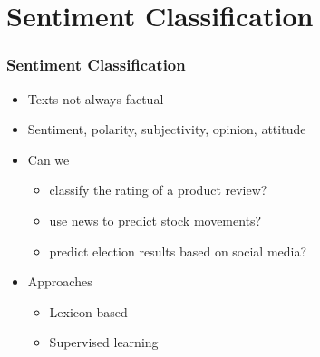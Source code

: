 
\section{Sentiment Classification}

\begin{frame}
\frametitle{Sentiment Classification}
\begin{itemize}
    \item Texts not always factual
    \item Sentiment, polarity, subjectivity, opinion, attitude
    \end{itemize}
    \begin{itemize}
    \item Can we
    \begin{itemize}
        \item classify the rating of a product review?
        \item use news to predict stock movements?
        \item predict election results based on social media?
    \end{itemize}
    \end{itemize}
    \begin{itemize}
    \item Approaches
    \begin{itemize}
        \item Lexicon based
        \item Supervised learning
    \end{itemize}
\end{itemize}
\end{frame}


